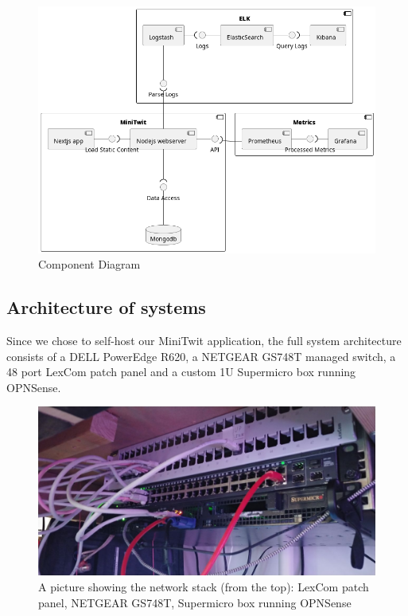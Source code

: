 \documentclass{article}
\begin{document}
\begin{figure}[H]
    \centering
    \includegraphics[scale=0.50]{component_diagram.png}
    \caption{Component Diagram}
    \label{componentdiagram}
\end{figure}

\subsection{Architecture of systems}

Since we chose to self-host our MiniTwit application, the full system architecture consists of a DELL PowerEdge R620, a NETGEAR GS748T managed switch, a 48 port LexCom patch panel and a custom 1U Supermicro box running OPNSense. 

\begin{figure}[H]
    \centering
    \includegraphics[scale=0.2]{network.jpg}
    \caption{A picture showing the network stack (from the top): LexCom patch panel, NETGEAR GS748T,  Supermicro box running OPNSense}
    \label{state}
\end{figure}
\end{document}
